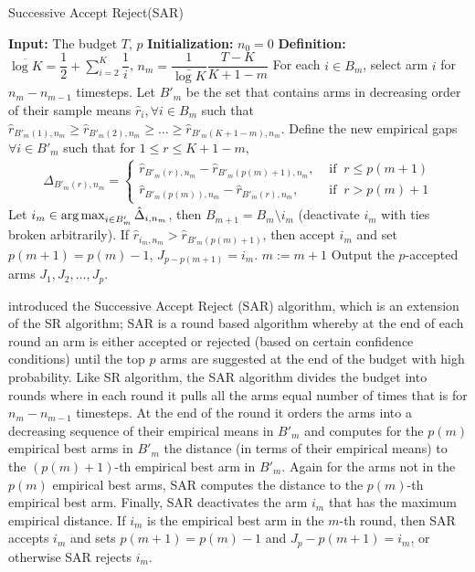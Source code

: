 \begin{algorithm}[!th]
\caption{Successive Accept Reject(SAR)}
\label{alg:sar}
\begin{algorithmic}[1]
\State \textbf{Input: } The budget $T$, $p$ 
\State \textbf{Initialization: } $n_0 = 0$
\State \textbf{Definition: } $\overline{\log K} = \dfrac{1}{2} + \sum_{i=2}^{K}\dfrac{1}{i}$, $n_m = \dfrac{1}{\bar{\log K}}\dfrac{T-K}{K + 1 - m}$
\State For each $i \in B_{m}$, select arm $i$ for $n_m - n_{m-1}$ timesteps.
\State Let $B'_{m}$ be the set that contains arms in decreasing order of their sample means $\hat{r}_{i},\forall i\in B_{m}$ such that $\hat{r}_{B'_{m}(1),n_m} \geq \hat{r}_{B'_{m}(2),n_m} \geq \ldots \geq \hat{r}_{B'_{m}(K+1-m),n_m}$.
\State Define the new empirical gaps $\forall i\in B'_{m}$ such that for $1\leq r\leq K+1-m$,
\begin{align*}
\Delta_{B'_{m}(r),n_m} =
    \begin{cases}
      \hat{r}_{B'_{m}(r),n_m} - \hat{r}_{B'_{m}(p(m)+1),n_m}, & \text{ if }\ r\leq p(m+1) \\
      \hat{r}_{B'_{m}(p(m)),n_m}  - \hat{r}_{B'_{m}(r),n_m}, & \text{ if }\ r> p(m)+1
    \end{cases}
\end{align*}
\State Let $i_m\in \operatorname*{arg\,max}_{i\in B'_m} \hat{\Delta}_{i,n_m}$, then $B_{m+1} = B_m\setminus i_m$ (deactivate $i_m$ with ties broken arbitrarily).
\State If $\hat{r}_{i_m,n_m} > \hat{r}_{B'_{m}(p(m)+1)}$, then accept $i_m$ and set $p(m+1)=p(m)-1$, $J_{p - p(m+1)}=i_m$.
\State $m:=m+1 $
\EndFor
\State Output the $p$-accepted arms $J_1,J_2,\ldots, J_p$.
\end{algorithmic}
\end{algorithm}

\citet{bubeck2013multiple} introduced the  Successive Accept Reject (SAR) algorithm, which is an extension of the SR algorithm; SAR is a round based algorithm whereby at the end of each round an arm is either accepted or rejected (based on certain confidence conditions) until the top $p$ arms are suggested at the end of the budget with high probability. Like SR algorithm, the SAR algorithm divides the budget into rounds where in each round it pulls all the arms equal  number of times that is for $n_m - n_{m-1}$ timesteps. At the end of the round it orders the arms into a decreasing sequence of their empirical means in $B'_{m}$ and computes for the $p(m)$ empirical best arms in $B'_{m}$ the distance (in terms of their empirical means) to the $(p(m) + 1)$-th empirical best arm in $B'_{m}$. Again for the arms not in the $p(m)$ empirical best arms, SAR computes the distance to the $p(m)$-th empirical best arm. Finally, SAR deactivates the arm $i_m$ that has the maximum empirical distance. If $i_m$ is the empirical best arm in the $m$-th round, then SAR accepts $i_m$ and sets $p(m + 1) = p(m) - 1$ and $J_p - p(m+1) = i_m$, or otherwise SAR rejects  $i_m$. 

